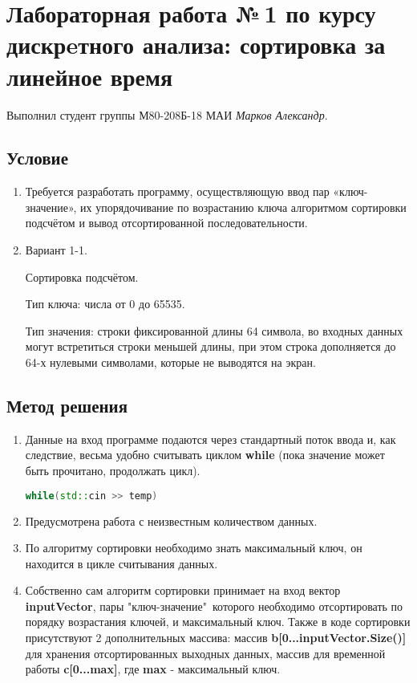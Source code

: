 \documentclass[12pt]{article}
\begin{document}
\section*{Лабораторная работа №\,1 по курсу дискрeтного анализа: сортировка за линейное время}

Выполнил студент группы М80-208Б-18 МАИ \textit{Марков Александр}.

\subsection*{Условие}
\begin{enumerate}
\item Требуется разработать программу, осуществляющую ввод пар «ключ-значение», их упорядочивание по возрастанию ключа алгоритмом сортировки подсчётом и вывод отсортированной последовательности. 
\item Вариант 1-1.

Сортировка подсчётом.

Тип ключа: числа от 0 до 65535.

Тип значения: строки фиксированной длины 64 символа, во входных данных могут встретиться строки меньшей длины, при этом строка дополняется до 64-х нулевыми символами, которые не выводятся на экран.
\end{enumerate}

\subsection*{Метод решения}

\begin{enumerate}
    \item Данные на вход программе подаются через стандартный поток ввода и, как следствие, весьма удобно считывать циклом \textbf{while} (пока значение может быть прочитано, продолжать цикл). 
    \begin{lstlisting}[language=C++]
    while(std::cin >> temp)
    \end{lstlisting}
    \item Предусмотрена работа с неизвестным количеством данных.
    \item По алгоритму сортировки необходимо знать максимальный ключ, он находится в цикле считывания данных.
    \item Собственно сам алгоритм сортировки принимает на вход вектор \textbf{inputVector}, пары "ключ-значение"\ которого необходимо отсортировать по порядку возрастания ключей, и максимальный ключ. Также в коде сортировки присутствуют 2 дополнительных массива: массив \textbf{b[0...inputVector.Size()]} для хранения отсортированных выходных данных, массив для временной работы \textbf{c[0...max]}, где \textbf{max} - максимальный ключ.
\end{enumerate}
\end{document}
